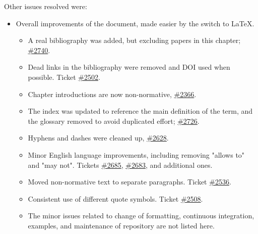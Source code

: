 Other issues resolved were:
\begin{itemize}
\item Overall improvements of the document, made easier by the switch to \LaTeX.
\begin{itemize}
\item A real bibliography was added, but excluding papers in this chapter; \href{https://github.com/modelica/ModelicaSpecification/pull/2740}{\#2740}.
\item Dead links in the bibliography were removed and DOI used when possible.
Ticket \href{https://github.com/modelica/ModelicaSpecification/pull/2502}{\#2502}.
\item Chapter introductions are now non-normative, \href{https://github.com/modelica/ModelicaSpecification/issues/2366}{\#2366}.
\item The index was updated to reference the main definition of the term, and the glossary removed to avoid duplicated effort; \href{https://github.com/modelica/ModelicaSpecification/pull/2726}{\#2726}.
\item Hyphens and dashes were cleaned up, \href{https://github.com/modelica/ModelicaSpecification/pull/2628}{\#2628}.
\item Minor English language improvements, including removing "allows to" and "may not".
Tickets \href{https://github.com/modelica/ModelicaSpecification/issues/2685}{\#2685}, \href{https://github.com/modelica/ModelicaSpecification/issues/2683}{\#2683}, and additional ones.
\item Moved non-normative text to separate paragraphs.
Ticket \href{https://github.com/modelica/ModelicaSpecification/issues/2536}{\#2536}.
\item Consistent use of different quote symbols.
Ticket \href{https://github.com/modelica/ModelicaSpecification/pull/2508}{\#2508}.
\item The minor issues related to change of formatting, continuous integration, examples, and maintenance of repository are not listed here.
\end{itemize}


\end{itemize}
